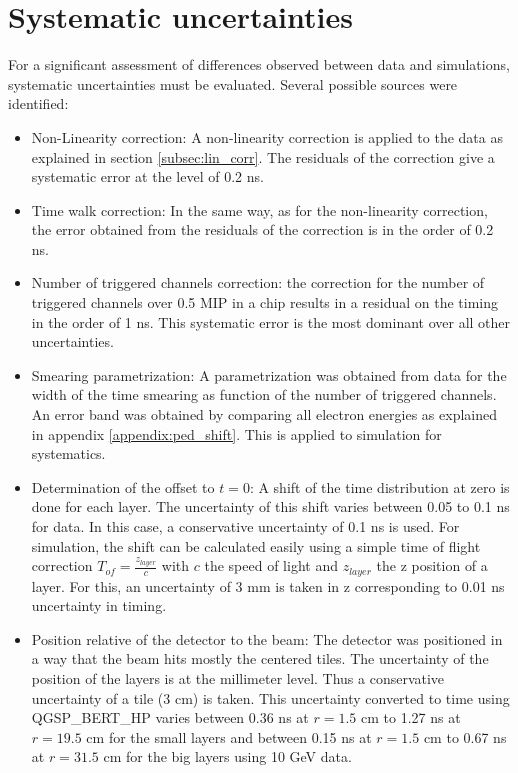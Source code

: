 \section{Systematic uncertainties}

For a significant assessment of differences observed between data and simulations, systematic uncertainties must be evaluated. Several possible sources were identified:

\begin{itemize}
	\item Non-Linearity correction: A non-linearity correction is applied to the data as explained in section \ref{subsec:lin_corr}. The residuals of the correction give a systematic error at the level of 0.2 ns.
	\item Time walk correction: In the same way, as for the non-linearity correction, the error obtained from the residuals of the correction is in the order of 0.2 ns.
	\item Number of triggered channels correction: the correction for the number of triggered channels over 0.5 MIP in a chip results in a residual on the timing in the order of 1 ns. This systematic error is the most dominant over all other uncertainties.
	\item Smearing parametrization: A parametrization was obtained from data for the width of the time smearing as function of the number of triggered channels. An error band was obtained by comparing all electron energies as explained in appendix \ref{appendix:ped_shift}. This is applied to simulation for systematics.
	\item Determination of the offset to $t=0$: A shift of the time distribution at zero is done for each layer. The uncertainty of this shift varies between 0.05 to 0.1 ns for data. In this case, a conservative uncertainty of 0.1 ns is used. For simulation, the shift can be calculated easily using a simple time of flight correction $T_{of} = \frac{z_{layer}}{c}$ with $c$ the speed of light and $z_{layer}$ the z position of a layer. For this, an uncertainty of 3 mm is taken in z corresponding to 0.01 ns uncertainty in timing.
	\item Position relative of the detector to the beam: The detector was positioned in a way that the beam hits mostly the centered tiles. The uncertainty of the position of the layers is at the millimeter level. Thus a conservative uncertainty of a tile (3 cm) is taken. This uncertainty converted to time using QGSP\_BERT\_HP varies between 0.36 ns at $r = 1.5$ cm to 1.27 ns at $r = 19.5$ cm for the small layers and between 0.15 ns at $r = 1.5$ cm to 0.67 ns at $r = 31.5$ cm for the big layers using 10 GeV data.

\end{itemize}
